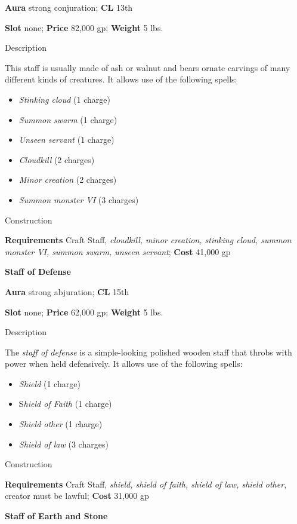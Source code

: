 \textbf{Aura} strong conjuration; \textbf{CL} 13th
				
\textbf{Slot} none; \textbf{Price} 82,000 gp; \textbf{Weight} 5 lbs.
				
Description
				
This staff is usually made of ash or walnut and bears ornate carvings of many different kinds of creatures. It allows use of the following spells:
				\begin{itemize}\item  \textit{Stinking cloud} (1 charge)
				\item  \textit{Summon swarm} (1 charge)
				\item  \textit{Unseen servant} (1 charge)
				\item  \textit{Cloudkill} (2 charges)
				\item  \textit{Minor creation} (2 charges)
				\item  \textit{Summon monster VI} (3 charges) 
\end{itemize}
				
Construction
				
\textbf{Requirements} Craft Staff, \textit{cloudkill, minor creation, stinking cloud, summon monster VI, summon swarm, unseen servant}; \textbf{Cost }41,000 gp
				
\textbf{Staff of Defense}
				
\textbf{Aura} strong abjuration;\textbf{ CL }15th
				
\textbf{Slot} none; \textbf{Price} 62,000 gp; \textbf{Weight} 5 lbs.
				
Description
				
The \textit{staff of defense }is a simple-looking polished wooden staff that throbs with power when held defensively. It allows use of the following spells:
				\begin{itemize}\item  \textit{Shield} (1 charge)
				\item  S\textit{hield of Faith} (1 charge)
				\item  \textit{Shield other} (1 charge)
				\item  \textit{Shield of law} (3 charges) 
\end{itemize}
				
Construction
				
\textbf{Requirements} Craft Staff, \textit{shield, shield of faith, shield of law, shield other}, creator must be lawful; \textbf{Cost }31,000 gp
				
\textbf{Staff of Earth and Stone}
				
